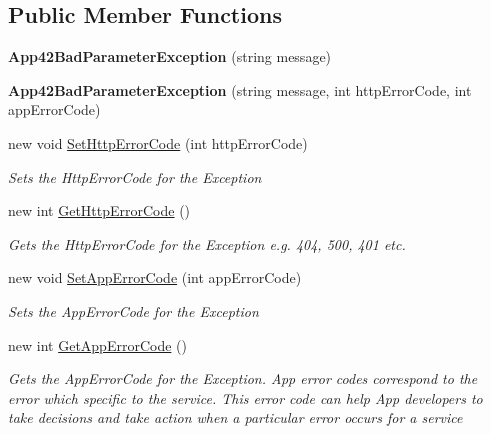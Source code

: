 \subsection*{Public Member Functions}
\begin{DoxyCompactItemize}
\item 
\hypertarget{classcom_1_1shephertz_1_1app42_1_1paas_1_1sdk_1_1csharp_1_1_app42_bad_parameter_exception_a07294216051287a854206cada0928ac3}{{\bfseries App42\+Bad\+Parameter\+Exception} (string message)}\label{classcom_1_1shephertz_1_1app42_1_1paas_1_1sdk_1_1csharp_1_1_app42_bad_parameter_exception_a07294216051287a854206cada0928ac3}

\item 
\hypertarget{classcom_1_1shephertz_1_1app42_1_1paas_1_1sdk_1_1csharp_1_1_app42_bad_parameter_exception_a3080af64658dccbbc19817e83b1c2b23}{{\bfseries App42\+Bad\+Parameter\+Exception} (string message, int http\+Error\+Code, int app\+Error\+Code)}\label{classcom_1_1shephertz_1_1app42_1_1paas_1_1sdk_1_1csharp_1_1_app42_bad_parameter_exception_a3080af64658dccbbc19817e83b1c2b23}

\item 
new void \hyperlink{classcom_1_1shephertz_1_1app42_1_1paas_1_1sdk_1_1csharp_1_1_app42_bad_parameter_exception_ac1a224f5ddd0258694a7af5d32473c3a}{Set\+Http\+Error\+Code} (int http\+Error\+Code)
\begin{DoxyCompactList}\small\item\em Sets the Http\+Error\+Code for the Exception \end{DoxyCompactList}\item 
new int \hyperlink{classcom_1_1shephertz_1_1app42_1_1paas_1_1sdk_1_1csharp_1_1_app42_bad_parameter_exception_a7f04f6747ddada11b11d872acf53ceb1}{Get\+Http\+Error\+Code} ()
\begin{DoxyCompactList}\small\item\em Gets the Http\+Error\+Code for the Exception e.\+g. 404, 500, 401 etc. \end{DoxyCompactList}\item 
new void \hyperlink{classcom_1_1shephertz_1_1app42_1_1paas_1_1sdk_1_1csharp_1_1_app42_bad_parameter_exception_a3ad6f7c5212a543d6bbde6edf030aac6}{Set\+App\+Error\+Code} (int app\+Error\+Code)
\begin{DoxyCompactList}\small\item\em Sets the App\+Error\+Code for the Exception \end{DoxyCompactList}\item 
new int \hyperlink{classcom_1_1shephertz_1_1app42_1_1paas_1_1sdk_1_1csharp_1_1_app42_bad_parameter_exception_a47557a4193251723a9ba53aff5e7fced}{Get\+App\+Error\+Code} ()
\begin{DoxyCompactList}\small\item\em Gets the App\+Error\+Code for the Exception. App error codes correspond to the error which specific to the service. This error code can help App developers to take decisions and take action when a particular error occurs for a service \end{DoxyCompactList}\end{DoxyCompactItemize}



